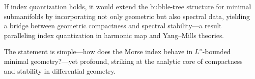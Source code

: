 If index quantization holds, it would extend the bubble-tree structure for minimal submanifolds by incorporating not only geometric but also spectral data, yielding a bridge between geometric compactness and spectral stability—a result paralleling index quantization in harmonic map and Yang–Mills theories.

The statement is simple—how does the Morse index behave in \(L^n\)-bounded minimal geometry?—yet profound, striking at the analytic core of compactness and stability in differential geometry.